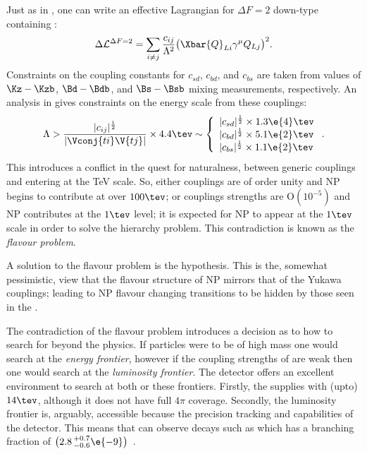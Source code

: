 Just as in , one can write an effective Lagrangian for $\Delta F=2$ down-type
\fcncs containing \np:
\begin{equation}
  \Delta\mathcal{L}^{\Delta F=2} =
  \sum_{i\neq j}\frac{c_{ij}}{\Lambda^2}
  \big(\Xbar{Q}_{Li}\gamma^\mu Q_{Lj}\big)^2.
\end{equation}
Constraints on the coupling constants for $c_{sd}$, $c_{bd}$, and $c_{bs}$ are taken from
values of $\Kz-\Kzb$, $\Bd-\Bdb$, and $\Bs-\Bsb$ mixing measurements, respectively.
An analysis in  gives constraints on the energy scale from these couplings:
\begin{equation}
  \Lambda > \frac{|c_{ij}|^\frac12}{|\Vconj{ti}\V{tj}|}\times4.4\tev
  \sim
  \left\{
    \begin{array}{l}
      |c_{sd}|^\frac12\times 1.3\e{4}\tev \\
      |c_{bd}|^\frac12\times 5.1\e{2}\tev \\
      |c_{bs}|^\frac12\times 1.1\e{2}\tev \\
    \end{array}\right..
\end{equation}
This introduces a conflict in the quest for naturalness, between generic couplings and \np entering
at the TeV scale.
So, either couplings are of order unity and NP begins to contribute at over $100\tev$; or couplings
strengths are $\mathrm{O}(10^{-5})$ and NP contributes at the $1\tev$ level;
it is expected for NP to appear at the $1\tev$ scale in order to solve the hierarchy problem.
This contradiction is known as the \emph{flavour problem}.

A solution to the flavour problem is the \MFV hypothesis.
This is the, somewhat pessimistic, view that the flavour structure of NP mirrors that of the Yukawa
couplings; leading to NP flavour changing transitions to be hidden by those seen in the \sm.


The contradiction of the flavour problem introduces a decision as to how to search for beyond the
\sm physics.
If \np particles were to be of high mass one would search at the \emph{energy frontier},
however if the coupling strengths of \np are weak then one would search at the
\emph{luminosity frontier}.
The \lhcb detector offers an excellent environment to search at both or these frontiers.
Firstly, the \lhc supplies \lhcb with (upto) $14\tev$, although it does not have full $4\pi$
coverage.
Secondly, the luminosity frontier is, arguably, accessible because the precision tracking and \pid
capabilities of the \lhcb detector.
This means that \lhcb can observe decays such as \decay{\Bs}{\mumu} which has a branching fraction
of $\big(2.8\,^{+0.7}_{-0.6}\e{-9}\big)$~\cite{LHCb-PAPER-2014-049}.






